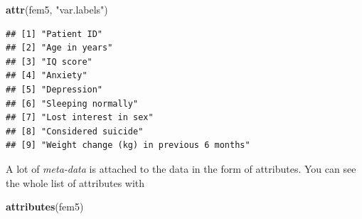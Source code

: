 \documentclass[
]{book}
\newenvironment{Shaded}{\begin{snugshade}}{\end{snugshade}}
\newcommand{\FunctionTok}[1]{\textcolor[rgb]{0.13,0.29,0.53}{\textbf{#1}}}
\newcommand{\NormalTok}[1]{#1}
\newcommand{\StringTok}[1]{\textcolor[rgb]{0.31,0.60,0.02}{#1}}
\theoremstyle{definition}
\theoremstyle{definition}
\theoremstyle{definition}
\theoremstyle{definition}
\theoremstyle{remark}
\begin{document}
\begin{Shaded}
\begin{Highlighting}[]
\FunctionTok{attr}\NormalTok{(fem5, }\StringTok{"var.labels"}\NormalTok{)}
\end{Highlighting}
\end{Shaded}

\begin{verbatim}
## [1] "Patient ID"                             
## [2] "Age in years"                           
## [3] "IQ score"                               
## [4] "Anxiety"                                
## [5] "Depression"                             
## [6] "Sleeping normally"                      
## [7] "Lost interest in sex"                   
## [8] "Considered suicide"                     
## [9] "Weight change (kg) in previous 6 months"
\end{verbatim}

A lot of \emph{meta-data} is attached to the data in the form of
attributes. You can see the whole list of attributes with

\begin{Shaded}
\begin{Highlighting}[]
\FunctionTok{attributes}\NormalTok{(fem5)}
\end{Highlighting}
\end{Shaded}
\end{document}
